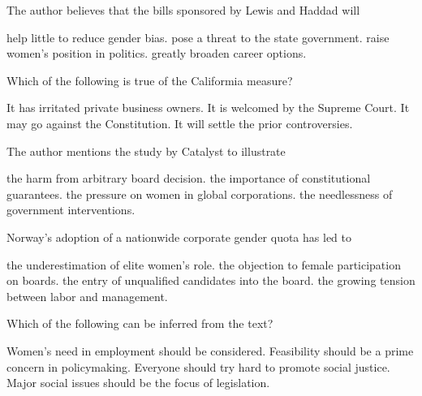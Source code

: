 \item The author believes that the bills sponsored by Lewis and Haddad will
\begin{tasks}
	\task help little to reduce gender bias.
	\task pose a threat to the state government.
	\task raise women's position in politics.
	\task greatly broaden career options.
\end{tasks}
\item Which of the following is true of the Califormia measure?
\begin{tasks}
	\task It has irritated private business owners.
	\task It is welcomed by the Supreme Court.
	\task It may go against the Constitution.
	\task It will settle the prior controversies.
\end{tasks}
\item The author mentions the study by Catalyst to illustrate
\begin{tasks}
	\task the harm from arbitrary board decision.
	\task the importance of constitutional guarantees.
	\task the pressure on women in global corporations.
	\task the needlessness of government interventions.
\end{tasks}
\item Norway's adoption of a nationwide corporate gender quota has led to
\begin{tasks}
	\task the underestimation of elite women's role.
	\task the objection to female participation on boards.
	\task the entry of unqualified candidates into the board.
	\task the growing tension between labor and management.
\end{tasks}
\item Which of the following can be inferred from the text?
\begin{tasks}
	\task Women's need in employment should be considered.
	\task Feasibility should be a prime concern in policymaking.
	\task Everyone should try hard to promote social justice.
	\task Major social issues should be the focus of legislation.
\end{tasks}